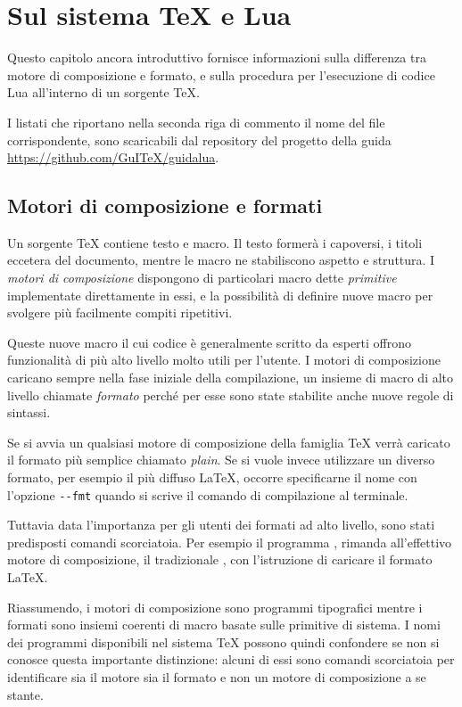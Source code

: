 

\chapter{Sul sistema \TeX{} e Lua}
\label{iichExplain}

Questo capitolo ancora introduttivo fornisce informazioni sulla differenza tra
motore di composizione e formato, e sulla procedura per l'esecuzione di codice
Lua all'interno di un sorgente \TeX.

I listati che riportano nella seconda riga di commento il nome del file
corrispondente, sono scaricabili dal repository del progetto della guida
\url{https://github.com/GuITeX/guidalua}.


\section{Motori di composizione e formati}

Un sorgente \TeX{} contiene testo e macro. Il testo formerà i capoversi, i
titoli eccetera del documento, mentre le macro ne stabiliscono aspetto e
struttura. I \emph{motori di composizione} dispongono di particolari macro dette
\emph{primitive} implementate direttamente in essi, e la possibilità di definire
nuove macro per svolgere più facilmente compiti ripetitivi.

Queste nuove macro il cui codice è generalmente scritto da esperti offrono
funzionalità di più alto livello molto utili per l'utente. I motori di
composizione caricano sempre nella fase iniziale della compilazione, un insieme
di macro di alto livello chiamate \emph{formato} perché per esse sono state
stabilite anche nuove regole di sintassi.

Se si avvia un qualsiasi motore di composizione della famiglia \TeX{} verrà
caricato il formato più semplice chiamato \emph{plain}. Se si vuole invece
utilizzare un diverso formato, per esempio il più diffuso \LaTeX{}, occorre
specificarne il nome con l'opzione \texttt{-{}-fmt} quando si scrive il comando
di compilazione al terminale.

Tuttavia data l'importanza per gli utenti dei formati ad alto livello, sono
stati predisposti comandi scorciatoia. Per esempio il programma
, rimanda all'effettivo motore di composizione, il tradizionale
, con l'istruzione di caricare il formato \LaTeX.

Riassumendo, i motori di composizione sono programmi tipografici mentre i
formati sono insiemi coerenti di macro basate sulle primitive di sistema. I nomi
dei programmi disponibili nel sistema \TeX{} possono quindi confondere se non si
conosce questa importante distinzione: alcuni di essi sono comandi scorciatoia
per identificare sia il motore sia il formato e non un motore di composizione a
se stante.


